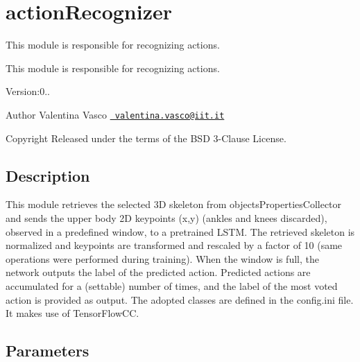 \section{action\+Recognizer}
\label{group__actionRecognizer}


This module is responsible for recognizing actions.  


This module is responsible for recognizing actions. 

Version\+:0.. \begin{DoxyAuthor}{Author}
Valentina Vasco \href{mailto:valentina.vasco@iit.it}{\texttt{ valentina.\+vasco@iit.\+it}} ~\newline
 
\end{DoxyAuthor}
\begin{DoxyCopyright}{Copyright}
Released under the terms of the B\+SD 3-\/Clause License. 
\end{DoxyCopyright}
\hypertarget{group__skeletonViewer_intro_sec}{}\subsection{Description}\label{group__skeletonViewer_intro_sec}
This module retrieves the selected 3D skeleton from objects\+Properties\+Collector and sends the upper body 2D keypoints (x,y) (ankles and knees discarded), observed in a predefined window, to a pretrained L\+S\+TM. The retrieved skeleton is normalized and keypoints are transformed and rescaled by a factor of 10 (same operations were performed during training). When the window is full, the network outputs the label of the predicted action. Predicted actions are accumulated for a (settable) number of times, and the label of the most voted action is provided as output. The adopted classes are defined in the config.\+ini file. It makes use of Tensor\+Flow\+CC.\hypertarget{group__skeletonViewer_parameters_sec}{}\subsection{Parameters}\label{group__skeletonViewer_parameters_sec}

